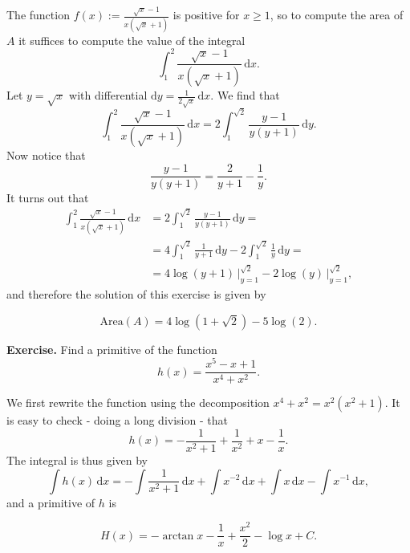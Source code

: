 \documentclass[a4paper,10 pt]{report}
\newcommand{\finalanswer}[1]{%
    \begin{finalAnswer}
    \[
        #1
    \]
    \end{finalAnswer}
}
\theoremstyle{definition}
\begin{document}
\begin{solutionBox} The function $f(x) := \frac{\sqrt{x} - 1}{x(\sqrt{x} + 1)}$ is positive for $x \geq 1$, so to compute the area of $A$ it suffices to compute the value of the integral
\begin{equation*} \int_1^2 \frac{\sqrt{x} - 1}{x(\sqrt{x} + 1)} \, \mathrm{d}x. \end{equation*}
Let $y = \sqrt{x}$ with differential $\mathrm{d}y = \frac{1}{2 \sqrt{x}} \, \mathrm{d}x$. We find that
\begin{equation*} \int_1^2 \frac{\sqrt{x} - 1}{x(\sqrt{x} + 1)} \, \mathrm{d}x =2 \int_1^{\sqrt{2}} \frac{y - 1}{y(y+1)} \, \mathrm{d}y.  \end{equation*}
Now notice that
\begin{equation*}  \frac{y - 1}{y(y+1)} = \frac{2}{y + 1} - \frac{1}{y}.  \end{equation*}
It turns out that
\begin{equation*}\begin{aligned} \int_1^2 \frac{\sqrt{x} - 1}{x(\sqrt{x} + 1)} \, \mathrm{d}x & =2 \int_1^{\sqrt{2}} \frac{y - 1}{y(y+1)} \, \mathrm{d}y =
\\[1em] & = 4 \int_1^{\sqrt{2}} \frac{1}{y+1} \, \mathrm{d}y - 2 \int_1^{\sqrt{2}} \frac{1}{y} \, \mathrm{d}y =
\\[1em] & = 4 \log(y + 1) \, \big|_{y = 1}^{\sqrt{2}} - 2 \log(y)\, \big|_{y = 1}^{\sqrt{2}},
\end{aligned} \end{equation*}
and therefore the solution of this exercise is given by
\finalanswer{
\mathrm{Area}(A) = 4 \log(1 + \sqrt{2}) - 5 \log(2).
}\end{solutionBox}

\begin{exerciseBox} \textbf{Exercise.} Find a primitive of the function
\begin{equation*} h(x) = \frac{x^5 - x + 1}{x^4 + x^2}. \end{equation*}
\end{exerciseBox}

\begin{solutionBox} We first rewrite the function using the decomposition $x^4 + x^2 = x^2(x^2 + 1)$. It is easy to check - doing a long division - that
\begin{equation*} h(x) = -\frac{1}{x^2 + 1} + \frac{1}{x^2} + x - \frac{1}{x}. \end{equation*}
The integral is thus given by
\begin{equation*} \int h(x) \, \mathrm{d}x = - \int \frac{1}{x^2 + 1} \, \mathrm{d}x + \int x^{-2} \, \mathrm{d}x +\int x \, \mathrm{d}x - \int x^{-1} \, \mathrm{d}x,\end{equation*}
and a primitive of $h$ is
\finalanswer{
 H(x) = - \arctan x - \frac{1}{x} + \frac{x^2}{2} - \log x + C.
}\end{solutionBox}
\end{document}
